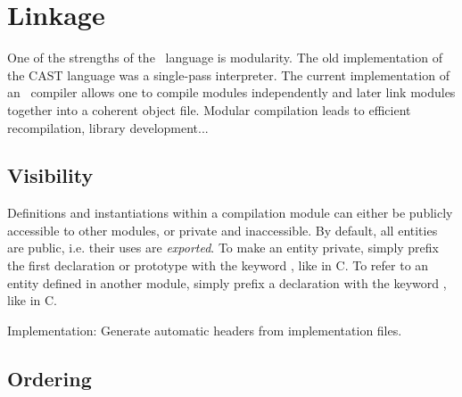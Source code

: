 
\chapter{Linkage}
\label{sec:linkage}

One of the strengths of the \artxx\ language is modularity.  
The old implementation of the CAST  language 
was a single-pass interpreter.  
The current implementation of an \artxx\ compiler allows
one to compile modules independently and later link modules together
into a coherent object file.  
Modular compilation leads to efficient recompilation, 
library development...

\section{Visibility}
\label{sec:linkage:visibility}

Definitions and instantiations within a compilation module can either be
publicly accessible to other modules, or private and inaccessible.  
By default, all entities are public, i.e. their uses are \emph{exported}.  
To make an entity private, simply prefix the first declaration
or prototype with the keyword , like in C.  
To refer to an entity defined in another module, 
simply prefix a declaration with the keyword , like in C.  

Implementation:
Generate automatic headers from implementation files.  

\section{Ordering}
\label{sec:linkage:ordering}




